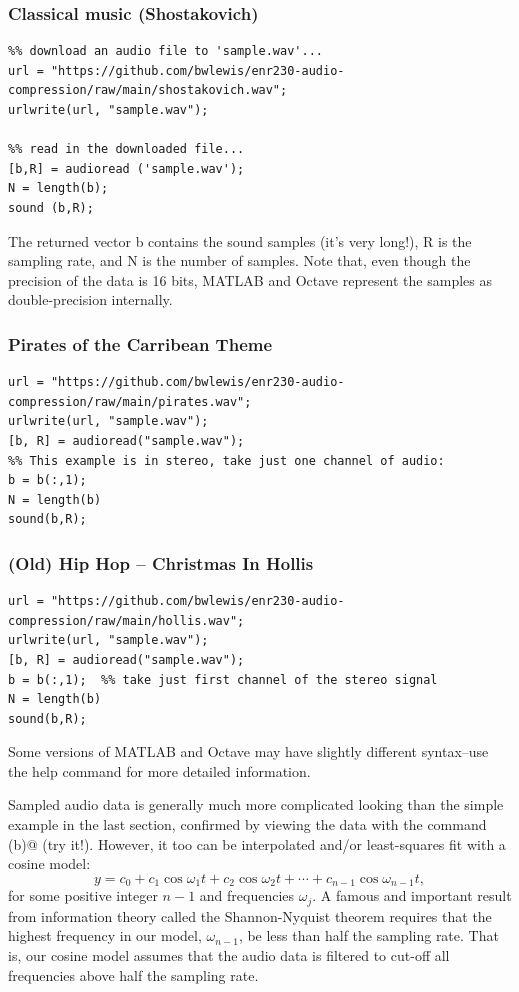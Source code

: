 \documentclass[10pt]{article}
\begin{document}
\subsubsection*{Classical music (Shostakovich)}
\begin{verbatim}
%% download an audio file to 'sample.wav'...
url = "https://github.com/bwlewis/enr230-audio-compression/raw/main/shostakovich.wav";
urlwrite(url, "sample.wav");

%% read in the downloaded file...
[b,R] = audioread ('sample.wav');
N = length(b);
sound (b,R);
\end{verbatim}
The returned vector b contains the sound samples (it's very long!), R is the
sampling rate, and N is the number of samples. Note that, even though the
precision of the data is 16 bits, MATLAB and Octave represent the samples as
double-precision internally.

\subsubsection*{Pirates of the Carribean Theme}
\begin{verbatim}
url = "https://github.com/bwlewis/enr230-audio-compression/raw/main/pirates.wav";
urlwrite(url, "sample.wav");
[b, R] = audioread("sample.wav");
%% This example is in stereo, take just one channel of audio:
b = b(:,1);
N = length(b)
sound(b,R);
\end{verbatim}

\subsubsection*{(Old) Hip Hop -- Christmas In Hollis}
\begin{verbatim}
url = "https://github.com/bwlewis/enr230-audio-compression/raw/main/hollis.wav";
urlwrite(url, "sample.wav");
[b, R] = audioread("sample.wav");
b = b(:,1);  %% take just first channel of the stereo signal
N = length(b)
sound(b,R);
\end{verbatim}

Some versions of MATLAB and Octave may have slightly different syntax--use the
help command for more detailed information. 
 
Sampled audio data is generally much more complicated looking than the simple
example in the last section, confirmed by viewing the data with the command
\verb@plot(b)@ (try it!). However, it too can be interpolated and/or
least-squares fit with a cosine model:
\[
y = c_0 + c_1\cos\omega_1t + c_2\cos\omega_2t + \cdots + c_{n-1}\cos\omega_{n-1}t,
\]
for some positive integer $n-1$ and frequencies ${\omega_j}$.  A famous and
important result from information theory called the Shannon-Nyquist theorem
requires that the highest frequency in our model, $\omega_{n - 1}$,  be less
than half the sampling rate. That is, our cosine model assumes that the audio
data is filtered to cut-off all frequencies above half the sampling rate. 
\end{document}
